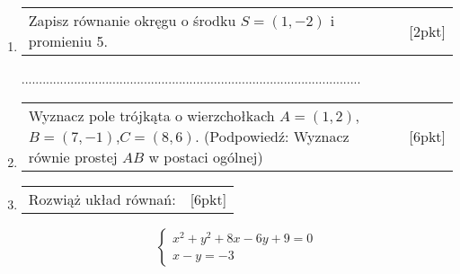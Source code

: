 \documentclass[12pt,a4paper]{article}
\begin{document}
\begin{enumerate}[1.]
		\item \begin{tabular}{p{13cm} r}
			Zapisz równanie okręgu o środku $S=(1,-2)$ i promieniu 5.&[2pkt]\\ 
		\end{tabular}
		\vspace{0.5cm}
		
		.................................................................................................
		
		\item \begin{tabular}{p{13cm} r}
			Wyznacz pole trójkąta o wierzchołkach $A=(1,2)$, $B=(7,-1)$,\newline $C=(8,6)$.
			\newline (Podpowiedź: Wyznacz równie prostej $AB$ w postaci ogólnej) &[6pkt]\\ 
		\end{tabular}
		\item \begin{tabular}{p{13cm} r}
			Rozwiąż układ równań: &[6pkt]\\ 
		\end{tabular}
		$$\left\{\begin{array}{l}
			x^2+y^2+8x-6y+9=0\\
			x-y=-3
		\end{array}\right.$$
	\end{enumerate}
	
\end{document}
